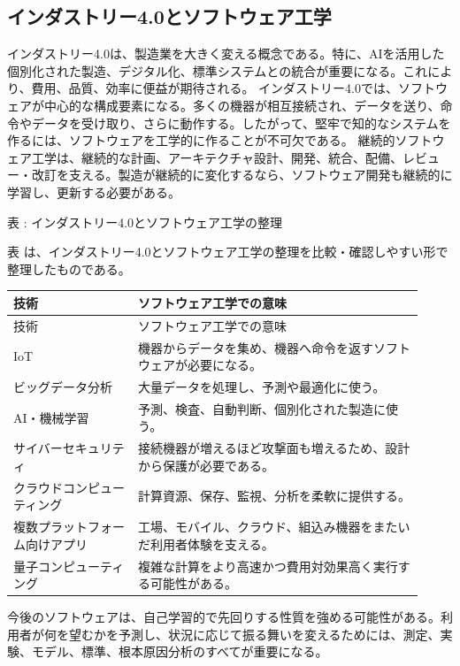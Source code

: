 \subsection{インダストリー4.0とソフトウェア工学}
インダストリー4.0は、製造業を大きく変える概念である。特に、AIを活用した個別化された製造、デジタル化、標準システムとの統合が重要になる。これにより、費用、品質、効率に便益が期待される。
インダストリー4.0では、ソフトウェアが中心的な構成要素になる。多くの機器が相互接続され、データを送り、命令やデータを受け取り、さらに動作する。したがって、堅牢で知的なシステムを作るには、ソフトウェアを工学的に作ることが不可欠である。
継続的ソフトウェア工学は、継続的な計画、アーキテクチャ設計、開発、統合、配備、レビュー・改訂を支える。製造が継続的に変化するなら、ソフトウェア開発も継続的に学習し、更新する必要がある。
\par\smallskip\noindent{}\label{tab:ch18-14}表 \thetable: インダストリー4.0とソフトウェア工学の整理\par\smallskip
表 \thetable は、インダストリー4.0とソフトウェア工学の整理を比較・確認しやすい形で整理したものである。\par\smallskip
\begin{longtable}{>{\raggedright\arraybackslash}p{0.28\linewidth}>{\raggedright\arraybackslash}p{0.64\linewidth}}
\toprule
技術 & ソフトウェア工学での意味 \\
\midrule
\endfirsthead
\toprule
技術 & ソフトウェア工学での意味 \\
\midrule
\endhead
IoT & 機器からデータを集め、機器へ命令を返すソフトウェアが必要になる。 \\
ビッグデータ分析 & 大量データを処理し、予測や最適化に使う。 \\
AI・機械学習 & 予測、検査、自動判断、個別化された製造に使う。 \\
サイバーセキュリティ & 接続機器が増えるほど攻撃面も増えるため、設計から保護が必要である。 \\
クラウドコンピューティング & 計算資源、保存、監視、分析を柔軟に提供する。 \\
複数プラットフォーム向けアプリ & 工場、モバイル、クラウド、組込み機器をまたいだ利用者体験を支える。 \\
量子コンピューティング & 複雑な計算をより高速かつ費用対効果高く実行する可能性がある。 \\
\bottomrule
\end{longtable}
今後のソフトウェアは、自己学習的で先回りする性質を強める可能性がある。利用者が何を望むかを予測し、状況に応じて振る舞いを変えるためには、測定、実験、モデル、標準、根本原因分析のすべてが重要になる。
